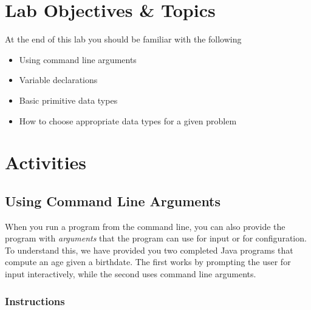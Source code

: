 \documentclass[12pt]{scrartcl}
\begin{document}
\section{Lab Objectives \& Topics}
At the end of this lab you should be familiar with the following
\begin{itemize}
  \item Using command line arguments
  \item Variable declarations 
  \item Basic primitive data types
  \item How to choose appropriate data types for a given problem
\end{itemize}

\section{Activities}

\subsection{Using Command Line Arguments}

When you run a program from the command line, you can also provide 
the program with \emph{arguments} that the program can use for input 
or for configuration.  To understand this, we have provided you two 
completed Java programs that compute an age given a birthdate.  The 
first works by prompting the user for input interactively, while the second 
uses command line arguments.

\subsubsection*{Instructions}
\end{document}
